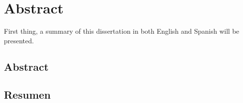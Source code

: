 \chapter{Abstract}


First thing, a summary of this dissertation in both English and Spanish will be presented.

\section{Abstract}









\section{Resumen}


